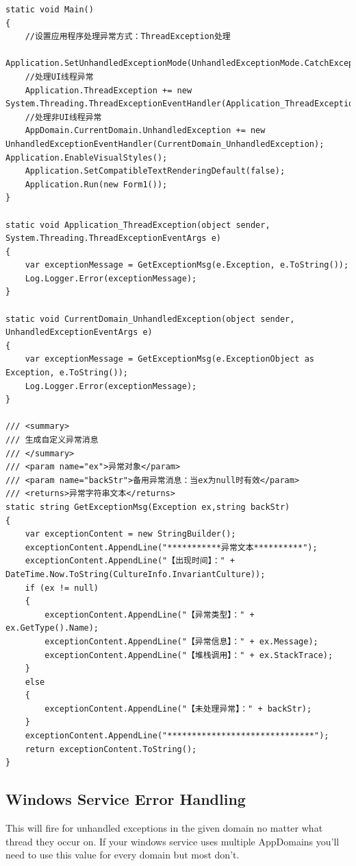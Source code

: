 \documentclass{book}
\begin{document}
\begin{lstlisting}[language={[Sharp]C}]
static void Main()
{
    //设置应用程序处理异常方式：ThreadException处理
    Application.SetUnhandledExceptionMode(UnhandledExceptionMode.CatchException);
    //处理UI线程异常
    Application.ThreadException += new System.Threading.ThreadExceptionEventHandler(Application_ThreadException);
    //处理非UI线程异常
    AppDomain.CurrentDomain.UnhandledException += new UnhandledExceptionEventHandler(CurrentDomain_UnhandledException);    Application.EnableVisualStyles();
    Application.SetCompatibleTextRenderingDefault(false);
    Application.Run(new Form1());
}

static void Application_ThreadException(object sender, System.Threading.ThreadExceptionEventArgs e)
{
    var exceptionMessage = GetExceptionMsg(e.Exception, e.ToString());
    Log.Logger.Error(exceptionMessage);
}

static void CurrentDomain_UnhandledException(object sender, UnhandledExceptionEventArgs e)
{
    var exceptionMessage = GetExceptionMsg(e.ExceptionObject as Exception, e.ToString());
    Log.Logger.Error(exceptionMessage);
}

/// <summary>
/// 生成自定义异常消息
/// </summary>
/// <param name="ex">异常对象</param>
/// <param name="backStr">备用异常消息：当ex为null时有效</param>
/// <returns>异常字符串文本</returns>
static string GetExceptionMsg(Exception ex,string backStr)
{
    var exceptionContent = new StringBuilder();
    exceptionContent.AppendLine("***********异常文本**********");
    exceptionContent.AppendLine("【出现时间】：" + DateTime.Now.ToString(CultureInfo.InvariantCulture));
    if (ex != null)
    {
	    exceptionContent.AppendLine("【异常类型】：" + ex.GetType().Name);
	    exceptionContent.AppendLine("【异常信息】：" + ex.Message);
	    exceptionContent.AppendLine("【堆栈调用】：" + ex.StackTrace);
    }
    else
    {
	    exceptionContent.AppendLine("【未处理异常】：" + backStr);
    }
    exceptionContent.AppendLine("******************************");
    return exceptionContent.ToString();
}
\end{lstlisting}

\subsection{Windows Service Error Handling}

This will fire for unhandled exceptions in the given domain 
no matter what thread they occur on. If your windows service 
uses multiple AppDomains you'll need to use this value for every domain but most don't.
\end{document}
